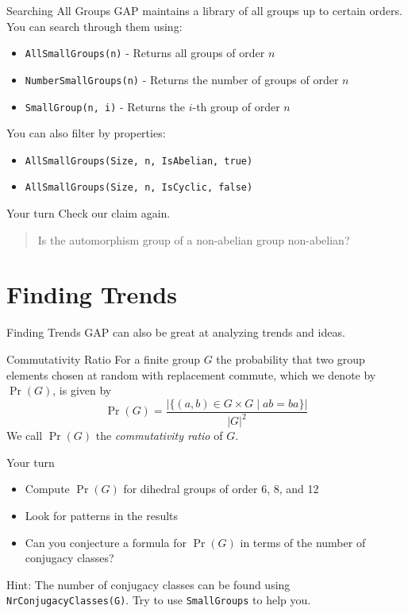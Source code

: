 \documentclass{beamer}
\begin{document}
\begin{frame}[fragile]{Searching All Groups}
    GAP maintains a library of all groups up to certain orders. You can search through them using:
    \begin{itemize}
        \item \verb|AllSmallGroups(n)| - Returns all groups of order $n$
        \item \verb|NumberSmallGroups(n)| - Returns the number of groups of order $n$
        \item \verb|SmallGroup(n, i)| - Returns the $i$-th group of order $n$
    \end{itemize}
    \pause
    You can also filter by properties:
    \begin{itemize}
        \item \verb|AllSmallGroups(Size, n, IsAbelian, true)|
        \item \verb|AllSmallGroups(Size, n, IsCyclic, false)|
    \end{itemize}
\end{frame}
\begin{frame}[fragile]{Your turn}
    Check our claim again.
    \begin{quote}
        Is the automorphism group of a non-abelian group non-abelian?
    \end{quote}
\end{frame}
\section{Finding Trends}
\begin{frame}{Finding Trends}
    GAP can also be great at analyzing trends and ideas.    
\end{frame}
\begin{frame}{Commutativity Ratio}
    For a finite group $G$ the probability that two group elements chosen at random with replacement commute, which we denote by $\operatorname{Pr}(G)$, is given by
    \[ \operatorname{Pr}(G) = \frac{|\{(a, b) \in G \times G \mid ab = ba\}|}{|G|^2}\]
We call $\operatorname{Pr}(G)$ the \textit{commutativity ratio} of $G$. 
\end{frame}
\begin{frame}[fragile]{Your turn}
    \begin{itemize}
        \item Compute $\operatorname{Pr}(G)$ for dihedral groups of order 6, 8, and 12
        \item Look for patterns in the results
        \item Can you conjecture a formula for $\operatorname{Pr}(G)$ in terms of the number of conjugacy classes?
    \end{itemize}
    \pause
    Hint: The number of conjugacy classes can be found using \verb|NrConjugacyClasses(G)|. Try to use \verb|SmallGroups| to help you.
\end{frame}
\end{document}
